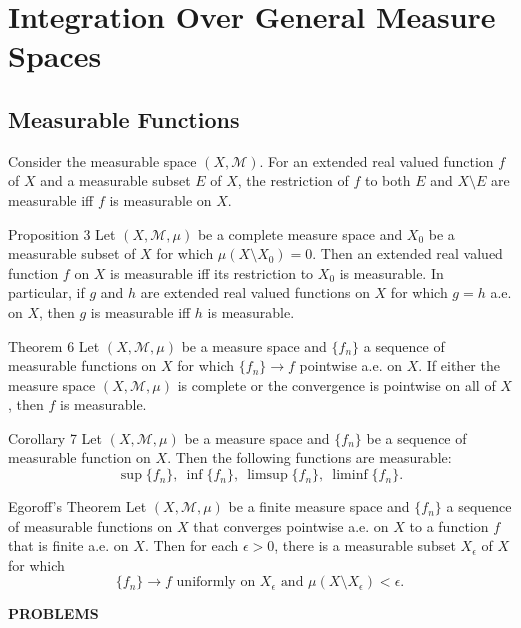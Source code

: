 \chapter{Integration Over General Measure Spaces}

\section{Measurable Functions}
Consider the measurable space $(X,\mathcal{M})$. 
For an extended real valued function $f$ of $X$ and a measurable subset $E$ of $X$, the restriction of $f$ to both $E$ and $X\setminus E$ are measurable iff $f$ is measurable on $X$.
\begin{namedthm*}{Proposition 3}
    Let $(X,\mathcal{M},\mu)$ be a complete measure space and $X_0$ be a measurable subset of $X$ for which $\mu(X\setminus X_0)=0$.
    Then an extended real valued function $f$ on $X$ is measurable iff its restriction to $X_0$ is measurable.
    In particular, if $g$ and $h$ are extended real valued functions on $X$ for which $g=h$ a.e. on $X$, then $g$ is measurable iff $h$ is measurable.
\end{namedthm*}
\begin{namedthm*}{Theorem 6}
    Let $(X,\mathcal{M},\mu)$ be a measure space and $\{f_n\}$ a sequence of measurable functions on $X$ for which $\{f_n\}\to f$ pointwise a.e. on $X$.
    If either the measure space $(X,\mathcal{M},\mu)$ is complete or the convergence is pointwise on all of $X$, then $f$ is measurable.
\end{namedthm*}
\begin{namedthm*}{Corollary 7}
    Let $(X,\mathcal{M},\mu)$ be a measure space and $\{f_n\}$ be a sequence of measurable function on $X$.
    Then the following functions are measurable:
    \[
        \sup\{f_n\},\ \inf\{f_n\},\ \limsup\{f_n\},\ \liminf\{f_n\}. 
    \]
\end{namedthm*}
\begin{namedthm*}{Egoroff's Theorem}
    Let $(X,\mathcal{M},\mu)$ be a finite measure space and $\{f_n\}$ a sequence of measurable functions on $X$ that converges pointwise a.e. on $X$ to a function $f$ that is finite a.e. on $X$.
    Then for each $\epsilon>0$, there is a measurable subset $X_\epsilon$ of $X$ for which 
    \[
        \{f_n\}\to f\text{ uniformly on }X_\epsilon\text{ and }\mu(X\setminus  X_\epsilon)<\epsilon.
    \]
\end{namedthm*}
\begin{center}
	\textbf{PROBLEMS}
\end{center}
